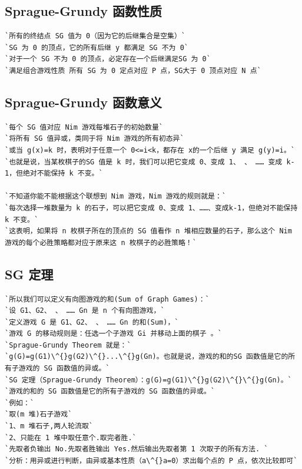 \documentclass[a4paper]{article}
\begin{document}
\begin{CJK*}{UTF8}{gbsn}
\begin{multicols}{3}
\begin{flushleft}
\subsection{Sprague-Grundy 函数性质}
\begin{lstlisting}
`所有的终结点 SG 值为 0（因为它的后继集合是空集）`
`SG 为 0 的顶点，它的所有后继 y 都满足 SG 不为 0`
`对于一个 SG 不为 0 的顶点，必定存在一个后继满足SG 为 0`
`满足组合游戏性质 所有 SG 为 0 定点对应 P 点，SG大于 0 顶点对应 N 点`
\end{lstlisting}

\subsection{Sprague-Grundy 函数意义}
\begin{lstlisting}
`每个 SG 值对应 Nim 游戏每堆石子的初始数量`
`将所有 SG 值异或，类同于将 Nim 游戏的所有初态异`
`或当 g(x)=k 时，表明对于任意一个 0<=i<k，都存在 x的一个后继 y 满足 g(y)=i。`
`也就是说，当某枚棋子的SG 值是 k 时，我们可以把它变成 0、变成 1、 、 …… 变成 k-1，但绝对不能保持 k 不变。`

`不知道你能不能根据这个联想到 Nim 游戏，Nim 游戏的规则就是：`
`每次选择一堆数量为 k 的石子，可以把它变成 0、变成 1、……、变成k-1，但绝对不能保持 k 不变。`
`这表明，如果将 n 枚棋子所在的顶点的 SG 值看作 n 堆相应数量的石子，那么这个 Nim 游戏的每个必胜策略都对应于原来这 n 枚棋子的必胜策略！`

\end{lstlisting}

\subsection{SG 定理}
\begin{lstlisting}
`所以我们可以定义有向图游戏的和(Sum of Graph Games)：`
`设 G1、G2、 、 …… Gn 是 n 个有向图游戏，`
`定义游戏 G 是 G1、G2、 、 …… Gn 的和(Sum)，`
`游戏 G 的移动规则是：任选一个子游戏 Gi 并移动上面的棋子 。`
`Sprague-Grundy Theorem 就是：`
`g(G)=g(G1)\^{}g(G2)\^{}...\^{}g(Gn)。也就是说，游戏的和的SG 函数值是它的所有子游戏的 SG 函数值的异或。`
`SG 定理（Sprague-Grundy Theorem）：g(G)=g(G1)\^{}g(G2)\^{}\^{}g(Gn)。`
`游戏的和的 SG 函数值是它的所有子游戏的 SG 函数值的异或。`
`例如：`
`取(m 堆)石子游戏`
`1、m 堆石子,两人轮流取`
`2、只能在 1 堆中取任意个.取完者胜.`
`先取者负输出 No.先取者胜输出 Yes.然后输出先取者第 1 次取子的所有方法. `
`分析：用异或进行判断，由异或基本性质（a\^{}a=0）求出每个点的 P 点，依次比较即可`
\end{lstlisting}


\end{flushleft}
\end{multicols}
\end{CJK*}
\end{document}
